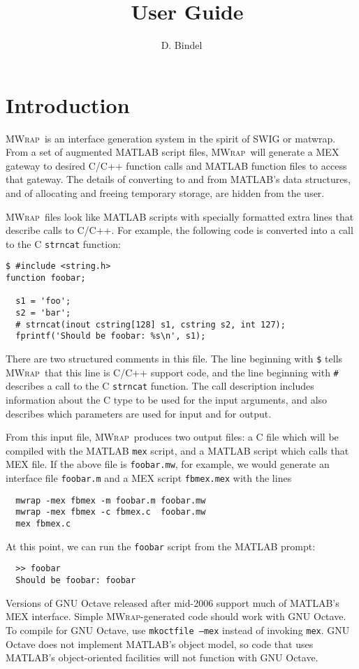 \documentclass[12pt]{article}
\title{\mwrap\ User Guide}
\author{D. Bindel}
\newcommand{\mwrap}{\textsc{MWrap}}
\begin{document}
\maketitle

\section{Introduction}

\mwrap\ is an interface generation system in the spirit of SWIG or
matwrap.  From a set of augmented MATLAB script files, \mwrap\ will
generate a MEX gateway to desired C/C++ function calls and MATLAB
function files to access that gateway.  The details of converting to
and from MATLAB's data structures, and of allocating and freeing
temporary storage, are hidden from the user.

\mwrap\ files look like MATLAB scripts with specially formatted
extra lines that describe calls to C/C++.  For example, the following
code is converted into a call to the C {\tt strncat} function:
\begin{verbatim}
$ #include <string.h>
function foobar;

  s1 = 'foo';
  s2 = 'bar';
  # strncat(inout cstring[128] s1, cstring s2, int 127);
  fprintf('Should be foobar: %s\n', s1);
\end{verbatim}
There are two structured comments in this file.  The line
beginning with \verb|$| tells \mwrap\ that this line is C/C++
support code, and the line beginning with \verb|#| describes
a call to the C {\tt strncat} function.  The call description
includes information about the C type to be used for the input
arguments, and also describes which parameters are used for input
and for output.

From this input file, \mwrap\ produces two output files: a C file
which will be compiled with the MATLAB {\tt mex} script, and a MATLAB
script which calls that MEX file.  If the above file is {\tt foobar.mw},
for example, we would generate an interface file {\tt foobar.m} and a
MEX script {\tt fbmex.mex} with the lines
\begin{verbatim}
  mwrap -mex fbmex -m foobar.m foobar.mw
  mwrap -mex fbmex -c fbmex.c  foobar.mw
  mex fbmex.c
\end{verbatim}
At this point, we can run the {\tt foobar} script from the MATLAB prompt:
\begin{verbatim}
  >> foobar
  Should be foobar: foobar
\end{verbatim}

Versions of GNU Octave released after mid-2006 support much of
MATLAB's MEX interface.  Simple {\mwrap}-generated code should work
with GNU Octave.  To compile for GNU Octave, use \texttt{mkoctfile
  --mex} instead of invoking \texttt{mex}.  GNU Octave does not
implement MATLAB's object model, so code that uses MATLAB's
object-oriented facilities will not function with GNU Octave.
\end{document}

